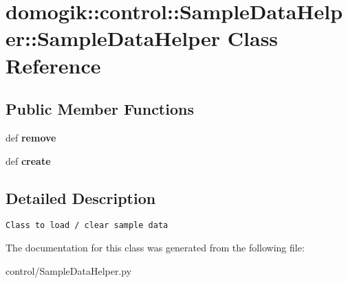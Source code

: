 \hypertarget{classdomogik_1_1control_1_1SampleDataHelper_1_1SampleDataHelper}{
\section{domogik::control::SampleDataHelper::SampleDataHelper Class Reference}
\label{classdomogik_1_1control_1_1SampleDataHelper_1_1SampleDataHelper}
}
\subsection*{Public Member Functions}
\begin{CompactItemize}
\item 
\hypertarget{classdomogik_1_1control_1_1SampleDataHelper_1_1SampleDataHelper_8289ab362d8b5048a413e6c5b3d3f4de}{
def \textbf{remove}}
\label{classdomogik_1_1control_1_1SampleDataHelper_1_1SampleDataHelper_8289ab362d8b5048a413e6c5b3d3f4de}

\item 
\hypertarget{classdomogik_1_1control_1_1SampleDataHelper_1_1SampleDataHelper_72168a6303032d0742cc905fa2bb3a65}{
def \textbf{create}}
\label{classdomogik_1_1control_1_1SampleDataHelper_1_1SampleDataHelper_72168a6303032d0742cc905fa2bb3a65}

\end{CompactItemize}


\subsection{Detailed Description}


\footnotesize\begin{verbatim}
Class to load / clear sample data
\end{verbatim}
\normalsize
 

The documentation for this class was generated from the following file:\begin{CompactItemize}
\item 
control/SampleDataHelper.py\end{CompactItemize}
